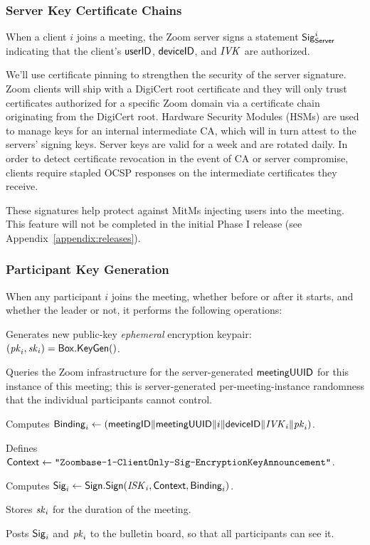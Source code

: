 \subsubsection{Server Key Certificate Chains}
\label{subsubsec:servercert}

When a client $i$ joins a meeting, the Zoom server signs a statement
${\sf Sig}^i_{\mathsf{Server}}$ indicating that the client's $\mathsf{userID}$, ${\sf deviceID}$,
and $\mathit{IVK}$ are authorized.

We'll use certificate pinning to strengthen the security of the server signature. Zoom clients will ship with a DigiCert root certificate and they will only trust certificates authorized for a specific Zoom domain via a certificate chain originating from the DigiCert root. Hardware Security Modules (HSMs) are used to manage keys for an internal intermediate CA, which will in turn attest to the servers' signing keys. Server keys are valid for a week and are rotated daily. In order to detect certificate revocation in the event of CA or server compromise, clients require stapled OCSP responses on the intermediate certificates they receive.

These signatures help protect against MitMs injecting users into the meeting. This feature will not be completed in the initial Phase I release (see Appendix~\ref{appendix:releases}).

\subsubsection{Participant Key Generation}
\label{subsubsec:partikeygen}
When any participant $i$ joins the meeting, whether before or after it starts, and whether the leader or not, it performs the following operations:

\begingroup
\RaggedRight
\begin{enumerate*}
\item Generates new public-key \textit{ephemeral} encryption keypair: $(\mathit{pk}_i, \mathit{sk}_i) = {\sf Box}.\mathsf{KeyGen}()$.
\item Queries the Zoom infrastructure for the server-generated ${\sf meetingUUID}$ for this instance of this meeting; this is server-generated per-meeting-instance randomness that the individual participants cannot control.
\item Computes ${\sf Binding}_i \leftarrow \left( {\sf meetingID} \| \allowbreak {\sf meetingUUID} \| i \allowbreak \| {\sf deviceID} \| \mathit{IVK}_i \| \allowbreak \mathit{pk}_i \right)$.
\item Defines ${\sf Context} \leftarrow \texttt{"Zoombase-1-ClientOnly-Sig-EncryptionKeyAnnouncement"}$.
\item Computes ${\sf Sig}_i \leftarrow {\sf Sign}.\mathsf{Sign}(\mathit{ISK}_i, {\sf Context}, {\sf Binding}_i)$.
\item Stores $\mathit{sk}_i$ for the duration of the meeting.
\item Posts ${\sf Sig}_i$ and $\mathit{pk}_i$ to the bulletin board, so that all participants can see it.
\end{enumerate*}
\endgroup

